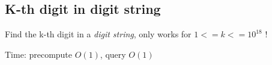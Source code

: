 \subsection{K-th digit in digit string}

Find the k-th digit in a \textit{digit string}, only works for $ 1 <= k <= 10^{18} $ !

Time: precompute $O(1)$, query $O(1)$
